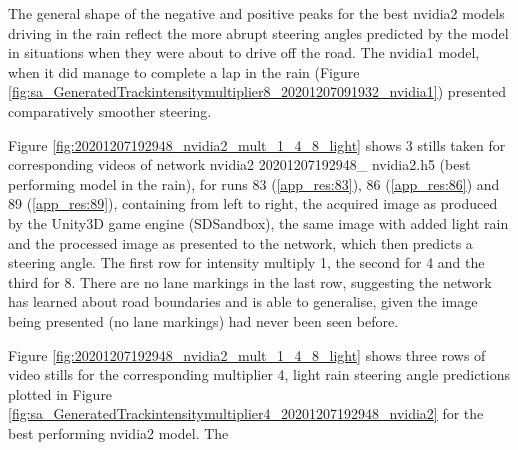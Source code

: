 The general shape of the negative and positive peaks for the best nvidia2 models driving in the rain reflect the more abrupt steering angles predicted by the model in situations when they were about to drive off the road. The nvidia1 model, when it did manage to complete a lap in the rain (Figure \ref{fig:sa_GeneratedTrackintensitymultiplier8_20201207091932_nvidia1}) presented comparatively smoother steering.



Figure \ref{fig:20201207192948_nvidia2_mult_1_4_8_light} shows 3 stills taken for corresponding videos of network nvidia2 20201207192948\_ nvidia2.h5 (best performing model in the rain), for runs 83 (\ref{app_res:83}), 86 (\ref{app_res:86}) and 89 (\ref{app_res:89}), containing from left to right, the acquired image as produced by the Unity3D game engine (SDSandbox), the same image with added light rain and the processed image as presented to the network, which then predicts a steering angle. The first row for intensity multiply 1, the second for 4 and the third for 8. There are no lane markings in the last row, suggesting the network has learned about road boundaries and is able to generalise, given the image being presented (no lane markings) had never been seen before.

Figure \ref{fig:20201207192948_nvidia2_mult_1_4_8_light} shows three rows of video  stills for the corresponding multiplier 4, light rain steering angle predictions plotted in Figure  \ref{fig:sa_GeneratedTrackintensitymultiplier4_20201207192948_nvidia2} for the best performing nvidia2 model. The 

